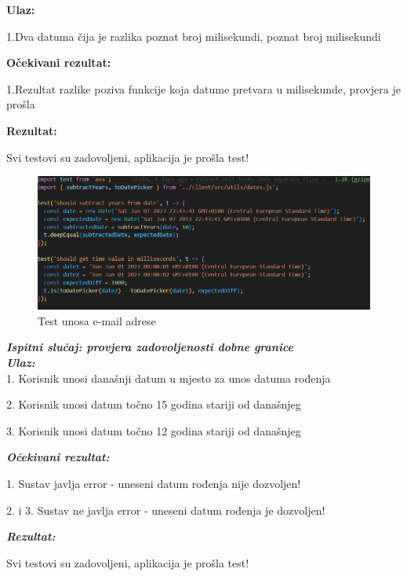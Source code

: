 \textbf{Ulaz:}

1.Dva datuma čija je razlika poznat broj milisekundi, poznat broj milisekundi

 \textbf{Očekivani rezultat:}  

1.Rezultat razlike poziva funkcije koja datume pretvara u milisekunde, provjera je prošla

\textbf{Rezultat:} 

 Svi testovi su zadovoljeni, aplikacija je prošla test!

\begin{figure}[H]
			\includegraphics[scale=0.5]{slike/date.PNG} %
			\centering
			\caption{Test unosa e-mail adrese}
			\label{fig:ppp}
			
		\end{figure}


 \textbf{\textit{Ispitni slučaj: provjera zadovoljenosti dobne granice}}\\

            \textbf{\textit{Ulaz:}}\\
            
             1. Korisnik unosi današnji datum u mjesto za unos datuma rođenja

             2. Korisnik unosi datum točno 15 godina stariji od današnjeg

             3. Korisnik unosi datum točno 12 godina stariji od današnjeg

             \textbf{\textit{Očekivani rezultat:}}

             1. Sustav javlja error - uneseni datum rođenja nije dozvoljen!

             2. i 3. Sustav ne javlja error - uneseni datum rođenja je dozvoljen!

             \textbf{\textit{Rezultat:}}

             Svi testovi su zadovoljeni, aplikacija je prošla test!

